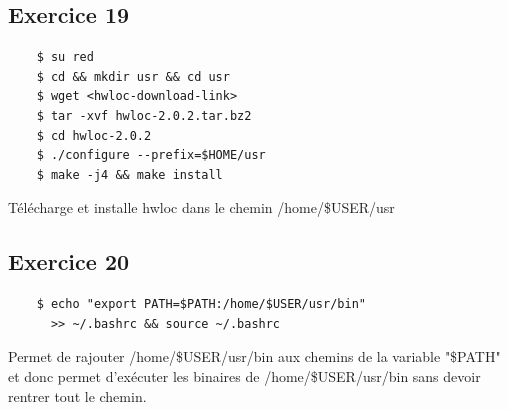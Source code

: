 \documentclass{report}
\begin{document}
\subsection{Exercice 19}

\begin{tcolorbox}
  \begin{verbatim}
    $ su red
    $ cd && mkdir usr && cd usr
    $ wget <hwloc-download-link>
    $ tar -xvf hwloc-2.0.2.tar.bz2
    $ cd hwloc-2.0.2
    $ ./configure --prefix=$HOME/usr
    $ make -j4 && make install
  \end{verbatim}
\end{tcolorbox}
Télécharge et installe hwloc dans le chemin /home/\$USER/usr

\subsection{Exercice 20}
\begin{tcolorbox}
  \begin{verbatim}
    $ echo "export PATH=$PATH:/home/$USER/usr/bin"
      >> ~/.bashrc && source ~/.bashrc
  \end{verbatim}
\end{tcolorbox}

Permet de rajouter /home/\$USER/usr/bin aux chemins de la variable "\$PATH" et donc permet d'exécuter les binaires de /home/\$USER/usr/bin
sans devoir rentrer tout le chemin.
\end{document}
